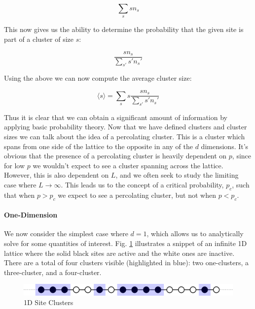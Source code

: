 \begin{equation}
	\label{eqn:p_in_cluster}
	\sum_s s n_s
\end{equation}

This now gives us the ability to determine the probability that the given site is part of a cluster of size $s$:

\begin{equation}
	\label{eqn:p_in_cluster_size_s}
	\frac{s n_s}{\sum_{s'} s' n_s'}
\end{equation}

Using the above we can now compute the average cluster size:

\begin{equation}
	\label{eqn:avg_cluster_size}
	\langle s \rangle = \sum_s s \frac{s n_s}{\sum_{s'} s' n_s'}
\end{equation}

Thus it is clear that we can obtain a significant amount of information by applying basic probability theory.
Now that we have defined clusters and cluster sizes we can talk about the idea of a percolating cluster.
This is a cluster which spans from one side of the lattice to the opposite in any of the $d$ dimensions.
It's obvious that the presence of a percolating cluster is heavily dependent on $p$, since for low $p$ we wouldn't expect to see a cluster spanning across the lattice.
However, this is also dependent on $L$, and we often seek to study the limiting case where $L \rightarrow \infty$.
This leads us to the concept of a critical probability, $p_c$, such that when $p > p_c$ we expect to see a percolating cluster, but not when $p < p_c$.

\paragraph{One-Dimension}
We now consider the simplest case where $d = 1$, which allows us to analytically solve for some quantities of interest.
Fig. \ref{fig:1d_site_clusters} illustrates a snippet of an infinite 1D lattice where the solid black sites are active and the white ones are inactive.
There are a total of four clusters visible (highlighted in blue): two one-clusters, a three-cluster, and a four-cluster.

\begin{figure}[H]
	\centering
	\includegraphics[width=350pt]{images/1d_site_clusters.png}
	\caption{1D Site Clusters}
	\label{fig:1d_site_clusters}
\end{figure}

